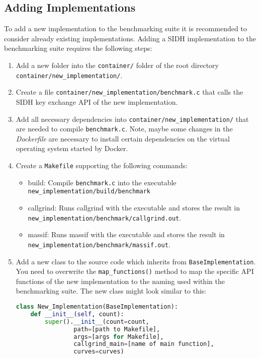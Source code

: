 \subsection{Adding Implementations}
To add a new implementation to the benchmarking suite it is recommended to consider already existing implementations. Adding a SIDH implementation to the benchmarking suite requires the following steps:
\begin{enumerate}
\itemsep0em 
\item Add a new folder into the \texttt{container/} folder of the root directory \\ \texttt{container/new\_implementation/}.
\item Create a file \texttt{container/new\_implementation/benchmark.c} that calls the SIDH key exchange API of the new implementation.
\item Add all necessary dependencies into \texttt{container/new\_implementation/} that are needed to compile \texttt{benchmark.c}. Note, maybe some changes in the \textit{Dockerfile} are necessary to install certain dependencies on the virtual operating system started by Docker.
\item Create a \texttt{Makefile} supporting the following commands:
	\begin{itemize}
		\item build: Compile \texttt{benchmark.c} into the executable \\ \texttt{new\_implementation/build/benchmark}
		\item callgrind: Runs callgrind with the executable and stores the result in\\ \texttt{new\_implementation/benchmark/callgrind.out}.
		\item massif: Runs massif with the executable and stores the result in\\ \texttt{new\_implementation/benchmark/massif.out}.
	\end{itemize}
\item Add a new class to the source code which inherits from \texttt{BaseImplementation}. You need to overwrite the \texttt{map\_functions()} method to map the specific API functions of the new implementation to the naming used within the benchmarking suite. The new class might look similar to this:

\begin{lstlisting}[language=Python]
class New_Implementation(BaseImplementation):
    def __init__(self, count):
        super().__init__(count=count,
				path=[path to Makefile], 
				args=[args for Makefile],
				callgrind_main=[name of main function],
				curves=curves)


\end{lstlisting}
\end{enumerate}
